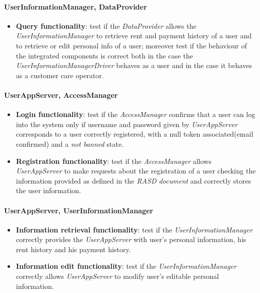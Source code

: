 \paragraph{UserInformationManager, DataProvider} 
\begin{itemize}
\item \textbf{Query functionality}: test if the \emph{DataProvider} allows the \emph{UserInformationManager}  to retrieve rent and payment history of a user and to retrieve or edit personal info of a user; moreover test if the behaviour of the integrated components is correct both in the case the \emph{UserInformationManagerDriver} behaves as a user and in the case it behaves as a customer care operator.
\end{itemize}

\paragraph{UserAppServer, AccessManager}
\begin{itemize}
\item \textbf{Login functionality}: test if the \emph{AccessManager} confirms that a user can log into the system only if username and password given by \emph{UserAppServer} corresponds to a user correctly registered, with a null token associated(email confirmed) and a \emph{not banned} state.
\item \textbf{Registration functionality}: test if the \emph{AccessManager} allows \emph{UserAppServer} to make requests about the registration of a user checking the information provided as defined in the \emph{RASD document}\cite{RASD} and correctly stores the user information.
\end{itemize}

\paragraph{UserAppServer, UserInformationManager}
\begin{itemize}
\item \textbf{Information retrieval functionality}: test if the \emph{UserInformationManager} correctly provides the \emph{UserAppServer} with user's personal information, his rent history and his payment history.
\item \textbf{Information edit functionality}: test if the \emph{UserInformationManager} correctly allows \emph{UserAppServer} to modify user's editable personal information.
\end{itemize}

